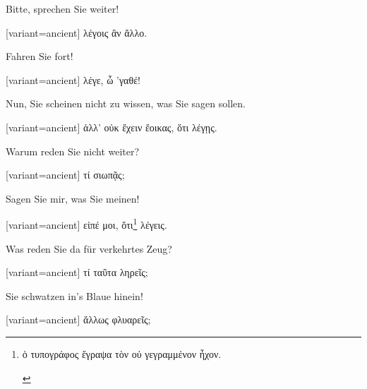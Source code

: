 Bitte, sprechen Sie weiter! 

\switchcolumn

\begin{greek}[variant=ancient]%
λέγοις ἂν ἄλλο.

\end{greek}%
\switchcolumn*

Fahren Sie fort! 

\switchcolumn

\begin{greek}[variant=ancient]%
λέγε, ὦ 'γαθέ!

\end{greek}%
\switchcolumn*

Nun, Sie scheinen nicht zu wissen, was Sie sagen sollen. 

\switchcolumn

\begin{greek}[variant=ancient]%
ἀλλ' οὐκ ἔχειν ἔοικας, ὅτι λέγῃς.

\end{greek}%
\switchcolumn*

Warum reden Sie nicht weiter? 

\switchcolumn

\begin{greek}[variant=ancient]%
τί σιωπᾷς;

\end{greek}%
\switchcolumn*

Sagen Sie mir, was Sie meinen! 

\switchcolumn

\begin{greek}[variant=ancient]%
εἰπέ μοι, ὅτι\footnote{\begin{latin}%
\textgreek[variant=ancient]{ὁ τυπογράφος ἔγραψα τὸν οὐ γεγραμμένον
ἦχον.}\end{latin}%
} λέγεις.

\end{greek}%
\switchcolumn*

Was reden Sie da für verkehrtes Zeug? 

\switchcolumn

\begin{greek}[variant=ancient]%
τί ταῦτα ληρεῖς;

\end{greek}%
\switchcolumn*

Sie schwatzen in's Blaue hinein! 

\switchcolumn

\begin{greek}[variant=ancient]%
ἄλλως φλυαρεῖς;

\end{greek}%
\switchcolumn*

